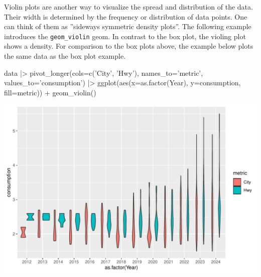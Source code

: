 Violin plots are another way to visualize the spread and distribution of the data. Their width is determined by the frequency or distribution of data points. One can think of them as ''sideways symmetric density plots''. The following example introduces the \texttt{geom\_violin} geom. In contrast to the box plot, the violing plot shows a density. For comparison to the box plots above, the example below plots the same data as the box plot example.

\begin{samepage}
\begin{Rcode}
data |>
  pivot_longer(cols=c('City', 'Hwy'), 
               names_to='metric', 
               values_to='consumption') |>
  ggplot(aes(x=as.factor(Year), y=consumption, fill=metric)) +
    geom_violin()
\end{Rcode}
\end{samepage}

\begin{center}
  \includegraphics[width=.8\textwidth]{fuel.violin.pdf}
\end{center}



